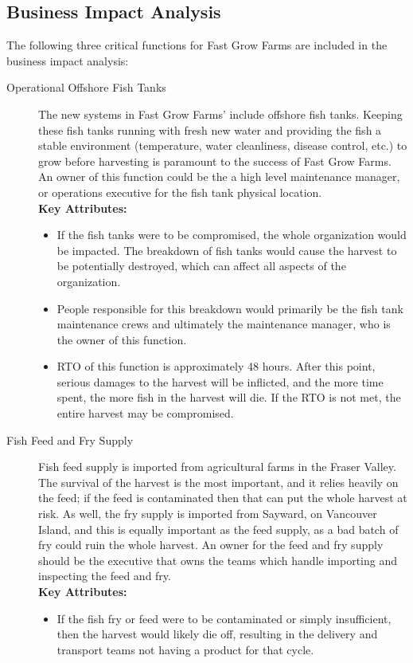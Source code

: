 \documentclass{article}
\numberwithin{equation}{section} %
\numberwithin{figure}{section} %
\numberwithin{table}{section} %
\begin{document}
\subsection{Business Impact Analysis}
The following three critical functions for Fast Grow Farms are included in the business impact analysis:
\begin{description}
	\item[Operational Offshore Fish Tanks]  The new systems in Fast Grow Farms' include offshore fish tanks.  Keeping these fish tanks running with fresh new water and providing the fish a stable environment (temperature, water cleanliness, disease control, etc.) to grow before harvesting is paramount to the success of Fast Grow Farms.  An owner of this function could be the a high level maintenance manager, or operations executive for the fish tank physical location.\\
	\textbf{Key Attributes: }
	\begin{itemize}
		\item If the fish tanks were to be compromised, the whole organization would be impacted.  The breakdown of fish tanks would cause the harvest to be potentially destroyed, which can affect all aspects of the organization.
		\item People responsible for this breakdown would primarily be the fish tank maintenance crews and ultimately the maintenance manager, who is the owner of this function.
		\item RTO of this function is approximately 48 hours.  After this point, serious damages to the harvest will be inflicted, and the more time spent, the more fish in the harvest will die.  If the RTO is not met, the entire harvest may be compromised.
	\end{itemize}
	\item[Fish Feed and Fry Supply]  Fish feed supply is imported from agricultural farms in the Fraser Valley.  The survival of  the harvest is the most important, and it relies heavily on the feed; if the feed is contaminated then that can put the whole harvest at risk.  As well, the fry supply is imported from Sayward, on Vancouver Island, and this is equally important as the feed supply, as a bad batch of fry could ruin the whole harvest.  An owner for the feed and fry supply should be the executive that owns the teams which handle importing and inspecting the feed and fry.  \\
	\textbf{Key Attributes:} 
	\begin{itemize}
		\item If the fish fry or feed were to be contaminated or simply insufficient, then the harvest would likely die off, resulting in the delivery and transport teams not having a product for that cycle.

\end{itemize}
\end{description}
\end{document}
